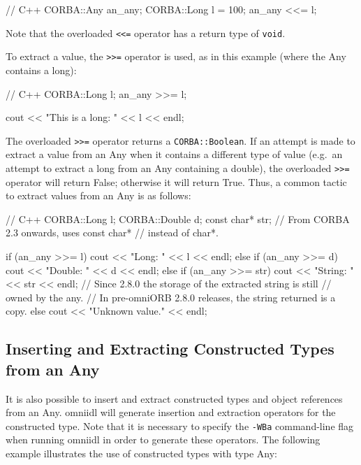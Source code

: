 \documentclass[11pt,twoside,a4paper]{book}
\newcommand{\type}[1]{\texttt{#1}}
\newcommand{\code}[1]{\texttt{#1}}
\begin{document}
\begin{cxxlisting}
// C++
CORBA::Any an_any;
CORBA::Long l = 100;
an_any <<= l;
\end{cxxlisting}


Note that the overloaded \code{<{}<=} operator has a return type of
\type{void}.

To extract a value, the \code{>{}>=} operator is used, as in this
example (where the Any contains a long):

\begin{cxxlisting}
// C++
CORBA::Long l;
an_any >>= l;

cout << "This is a long: " << l << endl;
\end{cxxlisting}


The overloaded \code{>{}>=} operator returns a \type{CORBA::Boolean}.
If an attempt is made to extract a value from an Any when it contains
a different type of value (e.g.\ an attempt to extract a long from an
Any containing a double), the overloaded \code{>{}>=} operator will
return False; otherwise it will return True. Thus, a common tactic to
extract values from an Any is as follows:

\begin{cxxlisting}
// C++
CORBA::Long l;
CORBA::Double d;
const char* str;     // From CORBA 2.3 onwards, uses const char*
                     // instead of char*. 

if (an_any >>= l) {
    cout << "Long: " << l << endl;
}
else if (an_any >>= d) {
    cout << "Double: " << d << endl;
}
else if (an_any >>= str) {
    cout << "String: " << str << endl;
    // Since 2.8.0 the storage of the extracted string is still
    // owned by the any.
    // In pre-omniORB 2.8.0 releases, the string returned is a copy.
}
else {
    cout << "Unknown value." << endl;
}
\end{cxxlisting}


\subsection{Inserting and Extracting Constructed Types from an Any}

It is also possible to insert and extract constructed types and object
references from an Any. omniidl will generate insertion and extraction
operators for the constructed type. Note that it is necessary to
specify the \texttt{-WBa} command-line flag when running omniidl in
order to generate these operators. The following example illustrates
the use of constructed types with type Any:
\end{document}
